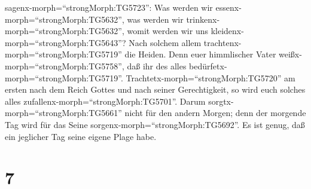 sagenx-morph=``strongMorph:TG5723'': Was werden wir
essenx-morph=``strongMorph:TG5632'', was werden wir
trinkenx-morph=``strongMorph:TG5632'', womit werden wir uns
kleidenx-morph=``strongMorph:TG5643''?  Nach solchem allem
trachtenx-morph=``strongMorph:TG5719'' die Heiden. Denn euer himmlischer
Vater weißx-morph=``strongMorph:TG5758'', daß ihr des alles
bedürfetx-morph=``strongMorph:TG5719''. 
Trachtetx-morph=``strongMorph:TG5720'' am ersten nach dem Reich Gottes
und nach seiner Gerechtigkeit, so wird euch solches alles
zufallenx-morph=``strongMorph:TG5701''.  Darum
sorgtx-morph=``strongMorph:TG5661'' nicht für den andern Morgen; denn
der morgende Tag wird für das Seine
sorgenx-morph=``strongMorph:TG5692''. Es ist genug, daß ein jeglicher
Tag seine eigene Plage habe.

\hypertarget{section-6}{%
\section{7}\label{section-6}}


